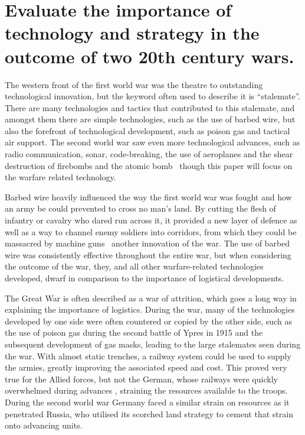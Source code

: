 \documentclass[12pt,a4paper]{article}
\begin{document}
\section*{Evaluate the importance of technology and strategy in the outcome of two 20th century wars.}

The western front of the first world war was the theatre to outstanding technological innovation, but the keyword often used to describe it is ``stalemate''. There are many technologies and tactics that contributed to this stalemate, and amongst them there are simple technologies, such as the use of barbed wire, but also the forefront of technological development, such as poison gas and tactical air support. The second world war saw even more technological advances, such as radio communication, sonar, code-breaking, the use of aeroplanes and the shear destruction of firebombs and the atomic bomb \textendash\ though this paper will focus on the warfare related technology. 

Barbed wire heavily influenced the way the first world war was fought and how an army be could prevented to cross no man's land. By cutting the flesh of infantry or cavalry who dared run across it, it provided a new layer of defence as well as a way to channel enemy soldiers into corridors, from which they could be massacred by machine guns \textendash\ another innovation of the war. The use of barbed wire was consistently effective throughout the entire war, but when considering the outcome of the war, they, and all other warfare-related technologies developed, dwarf in comparison to the importance of logistical developments.

The Great War is often described as a war of attrition, which goes a long way in explaining the importance of logistics. During the war, many of the technologies developed by one side were often countered or copied by the other side, such as the use of poison gas during the second battle of Ypres in 1915 and the subsequent development of gas masks, leading to the large stalemates seen during the war. With almost static trenches, a railway system could be used to supply the armies, greatly improving the associated speed and cost. This proved very true for the Allied forces, but not the German, whose railways were quickly overwhelmed during advances \citep[pp.138-141]{Creveld2004Supplying}, straining the resources available to the troops. During the second world war Germany faced a similar strain on resources as it penetrated Russia, who utilised its scorched land strategy to cement that strain onto advancing units.
\end{document}
